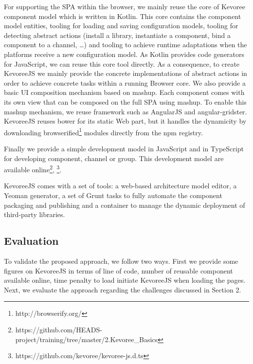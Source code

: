 For supporting the SPA within the browser, we mainly reuse the core of Kevoree component model which is written in Kotlin. This core contains the component model entities, tooling for loading and saving configuration models, tooling for detecting abstract actions (install a library, instantiate a component, bind a component to a channel, …)  and tooling to achieve runtime adaptations when the platforms receive a new configuration model. As Kotlin provides code generators for JavaScript, we can reuse this core tool directly. As a consequence, to create KevoreeJS we mainly provide the concrete implementations of abstract actions in order to achieve concrete tasks within a running Browser core. We also provide a basic UI composition mechanism based on mashup. Each component comes with its own view that can be composed on the full SPA using mashup. To enable this mashup mechanism, we reuse framework such as AngularJS and angular-gridster. KevoreeJS reuses bower for its static Web part, but it handles the dynamicity by downloading browserified\footnote{http://browserify.org/} modules directly from the npm registry. 


Finally we provide a simple development model in JavaScript and in TypeScript for developing component, channel or  group. This development model are available online\footnote{ https://github.com/HEADS-project/training/tree/master/2.Kevoree\_Basics}, \footnote{https://github.com/kevoree/kevoree-js.d.ts }.  

KevoreeJS comes with a set of tools: a web-based architecture model editor, a Yeoman generator, a set of Grunt tasks to fully automate the component packaging and publishing and a container to manage the dynamic deployment of third-party libraries. 

\subsection{Evaluation} 
To validate the proposed approach, we follow two ways. First we provide some figures on KevoreeJS in terms of line of code, number of reusable component available online, time penalty to load initiate KevoreeJS when loading the pages. Next, we evaluate the approach regarding the challenges discussed in Section 2. 

